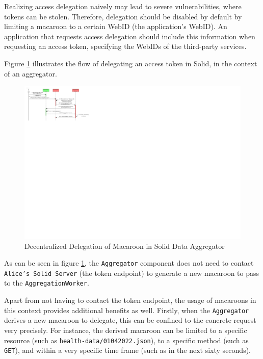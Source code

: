 Realizing access delegation naively may lead to severe vulnerabilities, where tokens can be stolen. Therefore, delegation should be disabled by default by limiting a macaroon to a certain WebID (the application's WebID). An application that requests access delegation should include this information when requesting an access token, specifying the WebIDs of the third-party services. 

Figure \ref{fig:decentralized-delegation-macaroon} illustrates the flow of delegating an access token in Solid, in the context of an aggregator.

\begin{figure}[H]
    \centering
   \includegraphics[width=1.0\textwidth]{images/macaroons-solid/InteractionDiagram-Decentralized-Delegation-of-Macaroon.pdf}
    \caption{Decentralized Delegation of Macaroon in Solid Data Aggregator}
    \label{fig:decentralized-delegation-macaroon}
\end{figure}

\noindent As can be seen in figure \ref{fig:decentralized-delegation-macaroon}, the \texttt{Aggregator} component does not need to contact \texttt{Alice's Solid Server} (the token endpoint) to generate a new macaroon to pass to the \texttt{AggregationWorker}. 

Apart from not having to contact the token endpoint, the usage of macaroons in this context provides additional benefits as well. 
Firstly, when the \texttt{Aggregator} derives a new macaroon to delegate, this can be confined to the concrete request very precisely. For instance, the derived macaroon can be limited to a specific resource (such as \texttt{health-data/01042022.json}), to a specific method (such as \texttt{GET}), and within a very specific time frame (such as in the next sixty seconds). 

